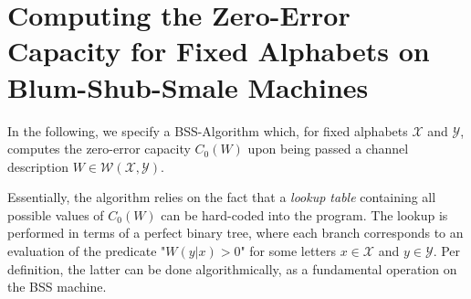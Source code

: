 \documentclass[conference]{IEEEtran}
\def\X{{\mathcal X}}
\def\Y{{\mathcal Y}}
\def\W{{\mathcal W}}
\begin{document}
\section{Computing the Zero-Error Capacity for Fixed Alphabets on Blum-Shub-Smale Machines}	\label{sec:ComputingZeroErrorOnBSS}
	\noindent In the following, we specify a BSS-Algorithm which, for fixed alphabets \(\X\) and \(\Y\), computes the zero-error capacity \(C_0(W)\) 
	upon being passed a channel description \(W \in \W(\X,\Y)\). 

	Essentially, the algorithm relies on the fact that a \emph{lookup table} containing all possible values of \(C_0(W)\) can be hard-coded into the program. The lookup is performed in 
	terms of a perfect binary tree, where each branch corresponds to an evaluation of the predicate "\(W(y|x) > 0\)" for some letters \(x\in\X\) and \(y\in\Y\). Per definition, the latter 
	can be done algorithmically, as a fundamental operation on the BSS machine.
\end{document}
